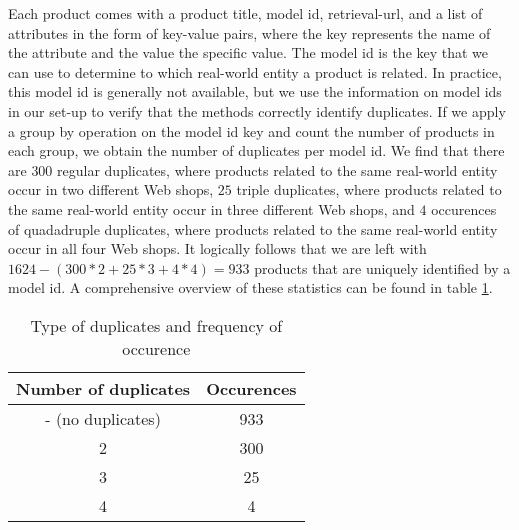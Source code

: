 Each product comes with a product title, model id, retrieval-url, and a list of attributes in the form of key-value pairs, where the key represents the name of the attribute and the value the specific value. The model id is the key that we can use to determine to which real-world entity a product is related. In practice, this model id is generally not available, but we use the information on model ids in our set-up to verify that the methods correctly identify duplicates. If we apply a group by operation on the model id key and count the number of products in each group, we obtain the number of duplicates per model id.  We find that there are $300$ regular duplicates, where products related to the same real-world entity occur in two different Web shops, $25$ triple duplicates, where products related to the same real-world entity occur in three different Web shops, and $4$ occurences of quadadruple duplicates, where products related to the same real-world entity occur in all four Web shops. It logically follows that we are left with $1624 - (300 * 2 + 25 * 3 + 4 * 4) = 933$ products that are uniquely identified by a model id. A comprehensive overview of these statistics can be found in table \ref{table:no_duplicates_occurences}.

\begin{table}
    \centering
    \caption{Type of duplicates and frequency of occurence}
    \begin{tabular}{ |c|c| } 
     \hline
     Number of duplicates & Occurences \\ 
     \hline
     - (no duplicates) & 933 \\
     \hline
     2 & 300  \\ 
     \hline
     3 & 25  \\ 
     \hline
     4 & 4  \\ 
     \hline
    \end{tabular}
    
    \label{table:no_duplicates_occurences}
\end{table}

